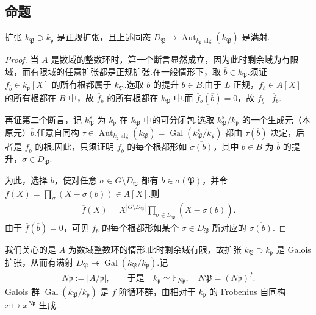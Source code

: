 \subsection{命题}\label{sec:nt-3-5-4}
\begin{proposition*}
扩张 $k_{\mathfrak P}\supset k_{\mathfrak p}$ 是正规扩张，且上述同态 $D_{\mathfrak P}\longrightarrow\operatorname{Aut}_{k_{\mathfrak p}\text{-alg}}(k_{\mathfrak P})$ 是满射.
\end{proposition*}
\begin{proof}
当 $A$ 是数域的整数环时，第一个断言显然成立，因为此时剩余域为有限域，而有限域的任意扩张都是正规扩张.在一般情形下，取 $\overline b\in k_{\mathfrak P}$.须证 $f_{\overline b}\in k_{\mathfrak p}[X]$ 的所有根都属于 $k_{\mathfrak P}$.选取 $\overline b$ 的提升 $b\in B$.由于 $L$ 正规，$f_b\in A[X]$ 的所有根都在 $B$ 中，故 $\overline f_b$ 的所有根都在 $k_{\mathfrak P}$ 中.而 $\overline f_b(\overline b)=0$，故 $f_{\overline b}\mid\overline f_b$.

再证第二个断言，记 $k_{\mathfrak P}^s$ 为 $k_{\mathfrak p}$ 在 $k_{\mathfrak P}$ 中的可分闭包.选取 $k_{\mathfrak P}^s/k_{\mathfrak p}$ 的一个生成元（本原元）$\overline b$.任意自同构 $\tau\in\operatorname{Aut}_{k_{\mathfrak p}\text{-alg}}(k_{\mathfrak P})=\operatorname{Gal}(k_{\mathfrak P}^s/k_{\mathfrak p})$ 都由 $\tau(\overline b)$ 决定，后者是 $f_{\overline b}$ 的根.因此，只须证明 $f_{\overline b}$ 的每个根都形如 $\overline{\sigma(b)}$，其中 $b\in B$ 为 $\overline b$ 的提升，$\sigma\in D_{\mathfrak P}$.

为此，选择 $b$，使对任意 $\sigma\in G\setminus D_{\mathfrak P}$ 都有 $b\in\sigma(\mathfrak P)$，并令 $f(X)=\prod_\sigma(X-\sigma(b))\in A[X]$.则
\begin{align*}
\overline f(X)=X^{|G\setminus D_{\mathfrak P}|}\prod_{\sigma\in D_{\mathfrak P}}(X-\overline{\sigma(b)}).
\end{align*}
由于 $\overline f(\overline b)=0$，可见 $f_{\overline b}$ 的每个根都形如某个 $\sigma\in D_{\mathfrak P}$ 所对应的 $\overline{\sigma(b)}$.
\end{proof}
\begin{remark*}
我们关心的是 $A$ 为数域整数环的情形.此时剩余域有限，故扩张 $k_{\mathfrak P}\supset k_{\mathfrak p}$ 是 Galois 扩张，从而有满射 $D_{\mathfrak P}\twoheadrightarrow\operatorname{Gal}(k_{\mathfrak P}/k_{\mathfrak p})$.记
\begin{align*}
N\mathfrak p:=|A/\mathfrak p|,\qquad\text{于是}\quad k_{\mathfrak p}\simeq\mathbb F_{N\mathfrak p},\quad N\mathfrak P=(N\mathfrak p)^f.
\end{align*}
Galois 群 $\operatorname{Gal}(k_{\mathfrak P}/k_{\mathfrak p})$ 是 $f$ 阶循环群，由相对于 $k_{\mathfrak p}$ 的 Frobenius 自同构 $x\mapsto x^{N\mathfrak p}$ 生成.
\end{remark*}

